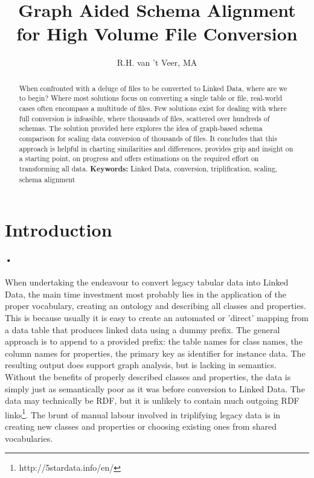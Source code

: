 \documentclass[12pt,twoside,a4paper]{article}
\begin{document}
\title{Graph Aided Schema Alignment for High Volume File Conversion}
\author{R.H. van 't Veer, MA}
\maketitle
\begin{abstract}
When confronted with a deluge of files to be converted to Linked Data, where are we to begin? Where most solutions focus on converting a single table or file, real-world cases often encompass a multitude of files. 
Few solutions exist for dealing with where full conversion is infeasible, where thousands of files, scattered over hundreds of schemas. The solution provided here explores the idea of graph-based schema comparison for scaling data conversion of thousands of files. It concludes that this approach is helpful in charting similarities and differences, provides grip and insight on a starting point, on progress and offers estimations on the required effort on transforming all data.
{\bf Keywords:} Linked Data, conversion, triplification, scaling, schema alignment
\end{abstract}
\section{Introduction}
\paragraph{•}
When undertaking the endeavour to convert legacy tabular data into Linked Data, the main time investment most probably lies in the application of the proper vocabulary, creating an ontology and describing all classes and properties. This is because usually it is easy to create an automated or 'direct' mapping from a data table that produces linked data using a dummy prefix. The general approach is to append to a provided prefix: the table names for class names, the column names for properties, the primary key as identifier for instance data.\cite{michel:hal-00903568} The resulting output does support graph analysis, but is lacking in semantics. Without the benefits of properly described classes and properties, the data is simply just as semantically poor as it was before conversion to Linked Data. The data may technically be RDF, but it is unlikely to contain much outgoing RDF links\footnote{http://5stardata.info/en/}. The brunt of manual labour involved in triplifying legacy data is in creating new classes and properties or choosing existing ones from shared vocabularies. 
\end{document}

